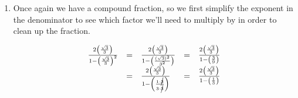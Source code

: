 \documentclass{ximera}
\begin{document}
\begin{example}
\begin{enumerate}
\[\begin{array}{rclr}
\frac{-(-4) -\sqrt{(-4)^2-4(2)(-3)}}{2(2)}  & = & \frac{-(-4) - \sqrt{16-4(2)(-3)}}{2(2)} & \\ & = & \frac{-(-4) - \sqrt{16-4(-6)}}{2(2)} & \\ 
& = & \frac{-(-4) - \sqrt{16-(-24)}}{2(2)} & \\ 
& = & \frac{-(-4) - \sqrt{16+24}}{2(2)} & \\ 
& = & \frac{-(-4) - \sqrt{40}}{2(2)} & \\ \end{array} \] As you may recall, $40$ can be factored using a perfect square as $40 = 4 \cdot 10$ so we use the product rule of radicals to write $\sqrt{40} = \sqrt{4 \cdot 10} = \sqrt{4} \sqrt{10} = 2 \sqrt{10}$.  This lets us factor a `$2$' out of both terms in the numerator, eventually allowing us to cancel it with a factor of $2$ in the denominator.\[ \begin{array}{rclcl}

 \frac{-(-4) - \sqrt{40}}{2(2)} & = &  \frac{-(-4) - 2\sqrt{10}}{2(2)} & = &  \frac{4  - 2\sqrt{10}}{2(2)} \\  
                                 & = &  \frac{2 \cdot 2  - 2\sqrt{10}}{2(2)} & = &  \frac{2(2  - \sqrt{10})}{2(2)} \\  
																& = &  \frac{\cancel{2}(2  - \sqrt{10})}{\cancel{2}(2)} & = &  \frac{2  - \sqrt{10}}{2} \\ \end{array} \]Since the numerator and denominator have no more common factors,\footnote{Do you see why we aren't `canceling' the remaining $2$'s?} we are done.

\item  Once again we have a compound fraction, so we first simplify the exponent in the denominator to see which factor we'll need to multiply by in order to clean up the fraction.

\[ \begin{array}{rclcl}

\frac{2 \left( \frac{\sqrt{3}}{3}\right)}{1 - \left( \frac{\sqrt{3}}{3} \right)^2} & = & \frac{2 \left( \frac{\sqrt{3}}{3}\right)}{1 - \left( \frac{(\sqrt{3})^2}{3^2} \right)} & = & \frac{2 \left( \frac{\sqrt{3}}{3}\right)}{1 - \left( \frac{3}{9} \right)}\\  
																				
& = & \frac{2 \left( \frac{\sqrt{3}}{3}\right)}{1 - \left( \frac{1 \cdot \cancel{3}}{3 \cdot \cancel{3}} \right)} & = & \frac{2 \left( \frac{\sqrt{3}}{3}\right)}{1 - \left( \frac{1}{3} \right)} \\ 
																

\end{array}\]
\end{enumerate}
\end{example}
\end{document}
